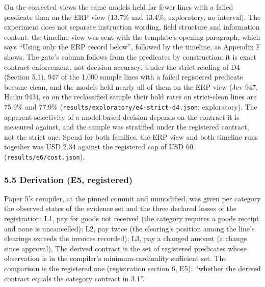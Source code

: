 \documentclass[
  10pt,
]{article}
\begin{document}
On the corrected views the same models held far fewer lines with a
failed predicate than on the ERP view (13.7\% and 13.4\%; exploratory,
no interval). The experiment does not separate instruction wording,
field structure and information content: the timeline view was sent with
the template's opening paragraph, which says ``Using only the ERP record
below'', followed by the timeline, as Appendix F shows. The gate's
column follows from the predicates by construction: it is exact contract
enforcement, not decision accuracy. Under the strict reading of D4
(Section 5.1), 947 of the 1,000 sample lines with a failed registered
predicate become clean, and the models held nearly all of them on the
ERP view (Jev 947, Haiku 943), so on the reclassified sample their hold
rates on strict-clean lines are 75.9\% and 77.9\%
(\texttt{results/exploratory/e4-strict-d4.json}; exploratory). The
apparent selectivity of a model-based decision depends on the contract
it is measured against, and the sample was stratified under the
registered contract, not the strict one. Spend for both families, the
ERP view and both timeline runs together was USD 2.34 against the
registered cap of USD 60 (\texttt{results/e6/cost.json}).

\hypertarget{derivation-e5-registered}{%
\subsubsection{5.5 Derivation (E5,
registered)}\label{derivation-e5-registered}}

Paper 5's compiler, at the pinned commit and unmodified, was given per
category the observed states of the evidence set and the three declared
losses of the registration: L1, pay for goods not received (the category
requires a goods receipt and none is uncancelled); L2, pay twice (the
clearing's position among the line's clearings exceeds the invoices
recorded); L3, pay a changed amount (a change since approval). The
derived contract is the set of registered predicates whose observation
is in the compiler's minimum-cardinality sufficient set. The comparison
is the registered one (registration section 6, E5): ``whether the
derived contract equals the category contract in 3.1''.
\end{document}
